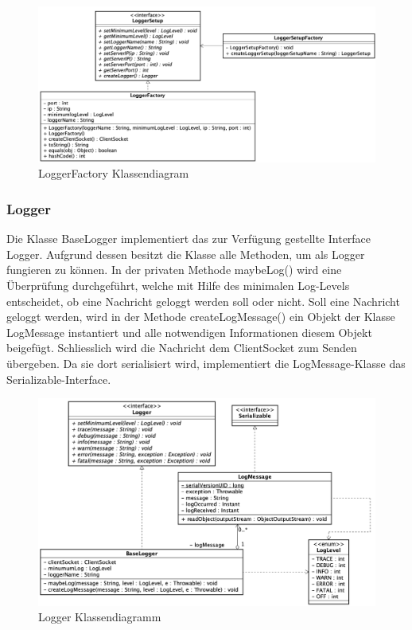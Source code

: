 \begin{figure}[H]
	\centering
	\includegraphics[width=\textwidth]{2_Architektur/Bilder/loggerFactory.png}
	\caption{LoggerFactory Klassendiagram}
	\label{fig:LoggerFactory Klassendiagramm}
\end{figure}

\subsubsection{Logger}
Die Klasse BaseLogger implementiert das zur Verfügung gestellte Interface Logger. Aufgrund dessen besitzt die Klasse alle Methoden, um als Logger fungieren zu können. In der privaten Methode maybeLog() wird eine Überprüfung durchgeführt, welche mit Hilfe des minimalen Log-Levels entscheidet, ob eine Nachricht geloggt werden soll oder nicht. Soll eine Nachricht geloggt werden, wird in der Methode createLogMessage() ein Objekt der Klasse LogMessage instantiert und alle notwendigen Informationen diesem Objekt beigefügt. Schliesslich wird die Nachricht dem ClientSocket zum Senden übergeben. Da sie dort serialisiert wird, implementiert die LogMessage-Klasse das Serializable-Interface.

\begin{figure}[H]
	\centering
	\includegraphics[width=\textwidth]{2_Architektur/Bilder/loggerClasses.png}
	\caption{Logger Klassendiagramm}
	\label{fig:Logger Klassendiagramm}
\end{figure}


